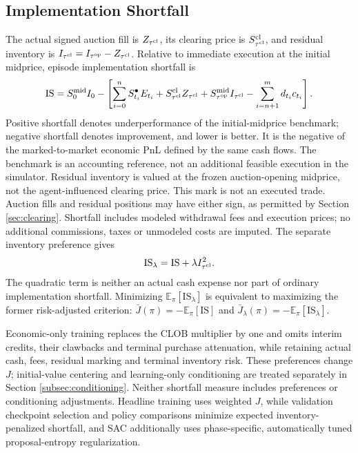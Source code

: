 \documentclass[11pt]{article}
\begin{document}
\begingroup
\subsection{Implementation Shortfall}
\label{subsec:shortfall}
The actual signed auction fill is $Z_{\tau^{\mathrm{cl}}}$, its clearing price is $S_{\tau^{\mathrm{cl}}}^{\mathrm{cl}}$, and residual inventory is $I_{\tau^{\mathrm{cl}}}=I_{\tau^{\mathrm{op}}}-Z_{\tau^{\mathrm{cl}}}$. Relative to immediate execution at the initial midprice, episode implementation shortfall is
\begin{equation}
\mathrm{IS}=S_0^{\mathrm{mid}}I_0-\left[\sum_{i=0}^{n}S_{t_i}^{\bullet}E_{t_i}
+S_{\tau^{\mathrm{cl}}}^{\mathrm{cl}}Z_{\tau^{\mathrm{cl}}}
+S_{\tau^{\mathrm{op}}}^{\mathrm{mid}}I_{\tau^{\mathrm{cl}}}-\sum_{i=n+1}^{m}d_{t_i}c_{t_i}\right].
\label{eq:shortfall}
\end{equation}
Positive shortfall denotes underperformance of the initial-midprice benchmark; negative shortfall denotes improvement, and lower is better. It is the negative of the marked-to-market economic PnL defined by the same cash flows. The benchmark is an accounting reference, not an additional feasible execution in the simulator. Residual inventory is valued at the frozen auction-opening midprice, not the agent-influenced clearing price. This mark is not an executed trade. Auction fills and residual positions may have either sign, as permitted by Section \ref{sec:clearing}. Shortfall includes modeled withdrawal fees and execution prices; no additional commissions, taxes or unmodeled costs are imputed. The separate inventory preference gives
\begin{equation}
\mathrm{IS}_\lambda=\mathrm{IS}+\lambda I_{\tau^{\mathrm{cl}}}^{2}.
\label{eq:penalized_shortfall}
\end{equation}
The quadratic term is neither an actual cash expense nor part of ordinary implementation shortfall. Minimizing $\mathbb E_\pi[\mathrm{IS}_\lambda]$ is equivalent to maximizing the former risk-adjusted criterion: $\bar J(\pi)=-\mathbb E_\pi[\mathrm{IS}]$ and $\bar J_\lambda(\pi)=-\mathbb E_\pi[\mathrm{IS}_\lambda]$.\vspace{0.5em}

Economic-only training replaces the CLOB multiplier by one and omits interim credits, their clawbacks and terminal purchase attenuation, while retaining actual cash, fees, residual marking and terminal inventory risk. These preferences change $J$; initial-value centering and learning-only conditioning are treated separately in Section \ref{subsec:conditioning}. Neither shortfall measure includes preferences or conditioning adjustments. Headline training uses weighted $J$, while validation checkpoint selection and policy comparisons minimize expected inventory-penalized shortfall, and SAC additionally uses phase-specific, automatically tuned proposal-entropy regularization.
\endgroup
\end{document}
